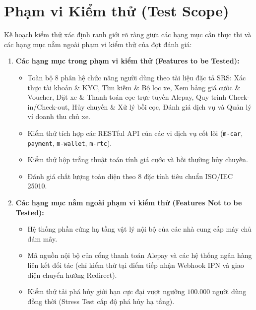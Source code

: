 \documentclass[12pt,a4paper,oneside]{report}
\begin{document}
\section{Phạm vi Kiểm thử (Test Scope)}
Kế hoạch kiểm thử xác định ranh giới rõ ràng giữa các hạng mục cần thực thi và các hạng mục nằm ngoài phạm vi kiểm thử của đợt đánh giá:
\begin{enumerate}
  \item \textbf{Các hạng mục trong phạm vi kiểm thử (Features to be Tested):}
    \begin{itemize}
      \item Toàn bộ 8 phân hệ chức năng người dùng theo tài liệu đặc tả SRS: Xác thực tài khoản \& KYC, Tìm kiếm \& Bộ lọc xe, Xem bảng giá cước \& Voucher, Đặt xe \& Thanh toán cọc trực tuyến Alepay, Quy trình Check-in/Check-out, Hủy chuyến \& Xử lý bồi cọc, Đánh giá dịch vụ và Quản lý ví doanh thu chủ xe.
      \item Kiểm thử tích hợp các RESTful API của các vi dịch vụ cốt lõi (\texttt{m-car}, \texttt{payment}, \texttt{m-wallet}, \texttt{m-rtc}).
      \item Kiểm thử hộp trắng thuật toán tính giá cước và bồi thường hủy chuyến.
      \item Đánh giá chất lượng toàn diện theo 8 đặc tính tiêu chuẩn ISO/IEC 25010.
    \end{itemize}
  \item \textbf{Các hạng mục nằm ngoài phạm vi kiểm thử (Features Not to be Tested):}
    \begin{itemize}
      \item Hệ thống phần cứng hạ tầng vật lý nội bộ của các nhà cung cấp máy chủ đám mây.
      \item Mã nguồn nội bộ của cổng thanh toán Alepay và các hệ thống ngân hàng liên kết đối tác (chỉ kiểm thử tại điểm tiếp nhận Webhook IPN và giao diện chuyển hướng Redirect).
      \item Kiểm thử tải phá hủy giới hạn cực đại vượt ngưỡng $100.000$ người dùng đồng thời (Stress Test cấp độ phá hủy hạ tầng).
    \end{itemize}
\end{enumerate}
\end{document}
